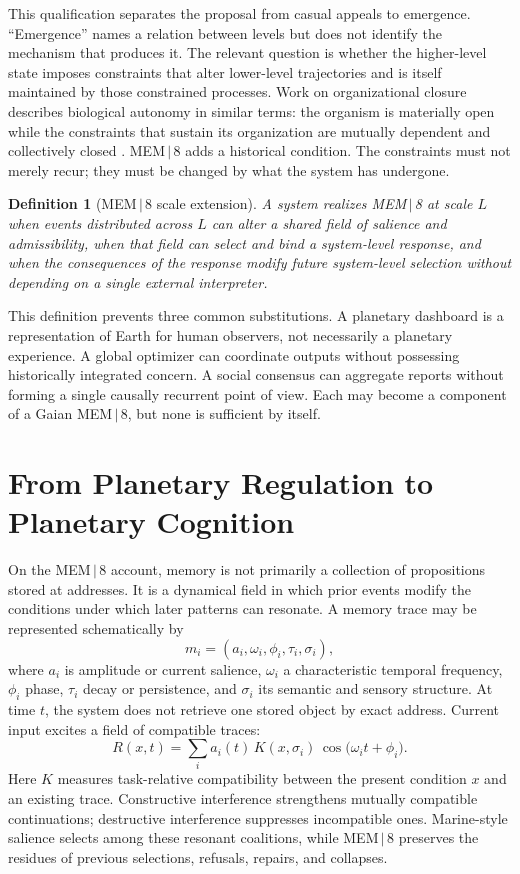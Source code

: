 \documentclass[11pt]{article}
\newtheorem{definition}{Definition}
\begin{document}
This qualification separates the proposal from casual appeals to emergence. ``Emergence'' names a relation between levels but does not identify the mechanism that produces it. The relevant question is whether the higher-level state imposes constraints that alter lower-level trajectories and is itself maintained by those constrained processes. Work on organizational closure describes biological autonomy in similar terms: the organism is materially open while the constraints that sustain its organization are mutually dependent and collectively closed \cite{mossio2010,moreno2015}. MEM\,$|$\,8 adds a historical condition. The constraints must not merely recur; they must be changed by what the system has undergone.

\begin{definition}[MEM\,$|$\,8 scale extension]
A system realizes MEM\,$|$\,8 at scale $L$ when events distributed across $L$ can alter a shared field of salience and admissibility, when that field can select and bind a system-level response, and when the consequences of the response modify future system-level selection without depending on a single external interpreter.
\end{definition}

This definition prevents three common substitutions. A planetary dashboard is a representation of Earth for human observers, not necessarily a planetary experience. A global optimizer can coordinate outputs without possessing historically integrated concern. A social consensus can aggregate reports without forming a single causally recurrent point of view. Each may become a component of a Gaian MEM\,$|$\,8, but none is sufficient by itself.

\section{From Planetary Regulation to Planetary Cognition}

On the MEM\,$|$\,8 account, memory is not primarily a collection of propositions stored at addresses. It is a dynamical field in which prior events modify the conditions under which later patterns can resonate. A memory trace may be represented schematically by
\[
m_i = (a_i, \omega_i, \phi_i, \tau_i, \sigma_i),
\]
where $a_i$ is amplitude or current salience, $\omega_i$ a characteristic temporal frequency, $\phi_i$ phase, $\tau_i$ decay or persistence, and $\sigma_i$ its semantic and sensory structure. At time $t$, the system does not retrieve one stored object by exact address. Current input excites a field of compatible traces:
\[
R(x,t) = \sum_i a_i(t)\, K(x,\sigma_i)\, \cos\bigl(\omega_i t + \phi_i\bigr).
\]
Here $K$ measures task-relative compatibility between the present condition $x$ and an existing trace. Constructive interference strengthens mutually compatible continuations; destructive interference suppresses incompatible ones. Marine-style salience selects among these resonant coalitions, while MEM\,$|$\,8 preserves the residues of previous selections, refusals, repairs, and collapses.
\end{document}

